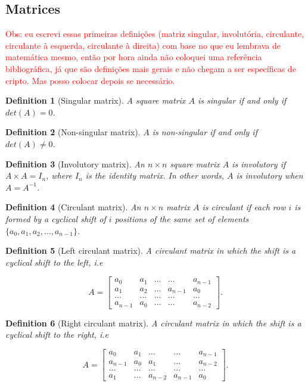 \documentclass{report}
\newtheorem{definition}{Definition}{\bfseries}{\itshape}
\begin{document}
\subsection{Matrices}

\textcolor{red}{Obs: eu escrevi essas primeiras definições (matriz singular, involutória, circulante, circulante à esquerda, circulante à direita) com base no que eu lembrava de matemática mesmo, então por hora ainda não coloquei uma referência bibliográfica, já que são definições mais gerais e não chegam a ser específicas de cripto. Mas posso colocar depois se necessário.}

\begin{definition}[Singular matrix]
A square matrix $A$ is singular if and only if $det(A) = 0$.
\end{definition}

\begin{definition}[Non-singular matrix]
$A$ is non-singular if and only if $det(A) \neq 0$.
\end{definition}

\begin{definition}[Involutory matrix]
An $n \times n$ square matrix $A$ is involutory if $A \times A = I_n$, where $I_n$ is the identity matrix. In other words, $A$ is involutory when $A = A^{-1}$.
\end{definition}

\begin{definition}[Circulant matrix]
An $n \times n$ matrix $A$ is circulant if each row $i$ is formed by a cyclical shift of $i$ positions of the same set of elements $\{a_0, a_1, a_2, ..., a_{n-1}\}$.
\end{definition}

\begin{definition}[Left circulant matrix]
A circulant matrix in which the shift is a cyclical shift to the left, i.e

$$
A =
\begin{bmatrix}
a_0 & a_1 & ... & ... & a_{n-1}\\
a_1 & a_2 & ... & a_{n-1} & a_0\\
... & ... & ... & ... & ...\\
a_{n-1} & a_0 & ... & ... & a_{n-2}
\end{bmatrix}.
$$
\end{definition}

\begin{definition}[Right circulant matrix]
A circulant matrix in which the shift is a cyclical shift to the right, i.e

$$
A =
\begin{bmatrix}
a_0 & a_1 & ... & ... & a_{n-1}\\
a_{n-1} & a_0 & a_1 & ... & a_{n-2}\\
... & ... & ... & ... & ...\\
a_1 & ... & a_{n-2} & a_{n-1} & a_0
\end{bmatrix}.
$$
\end{definition}
\end{document}
